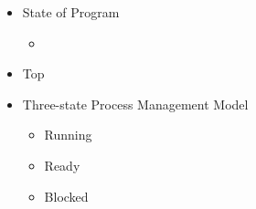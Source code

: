 \documentclass[12pt]{article}
\begin{document}
\begin{itemize}
\begin{itemize}
        \item State of Program
        \begin{itemize}
            \item
        \end{itemize}

        \item Top
        \item Three-state Process Management Model

        \begin{itemize}
            \item Running
            \item Ready
            \item Blocked
        \end{itemize}
    \end{itemize}
\end{itemize}
\end{document}
